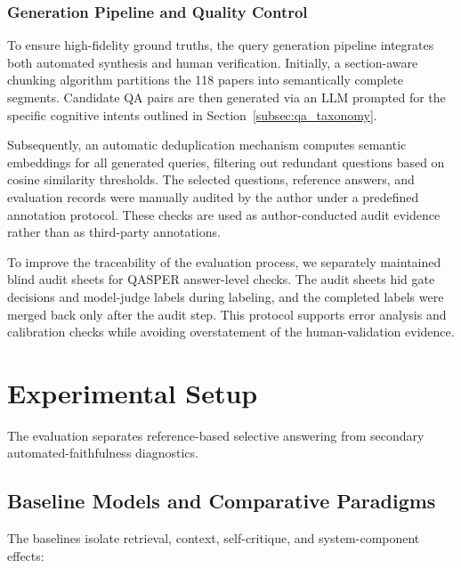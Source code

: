 \documentclass[smallextended]{svjour3}
\begin{document}
\subsubsection{Generation Pipeline and Quality Control}
\label{subsec:quality_control}
To ensure high-fidelity ground truths, the query generation pipeline integrates both automated synthesis and human verification. Initially, a section-aware chunking algorithm partitions the 118 papers into semantically complete segments. Candidate QA pairs are then generated via an LLM prompted for the specific cognitive intents outlined in Section~\ref{subsec:qa_taxonomy}. 

Subsequently, an automatic deduplication mechanism computes semantic embeddings for all generated queries, filtering out redundant questions based on cosine similarity thresholds. The selected questions, reference answers, and evaluation records were manually audited by the author under a predefined annotation protocol. These checks are used as author-conducted audit evidence rather than as third-party annotations.

To improve the traceability of the evaluation process, we separately maintained blind audit sheets for QASPER answer-level checks. The audit sheets hid gate decisions and model-judge labels during labeling, and the completed labels were merged back only after the audit step. This protocol supports error analysis and calibration checks while avoiding overstatement of the human-validation evidence.

\section{Experimental Setup}
\label{sec:experimental_setup}

The evaluation separates reference-based selective answering from secondary automated-faithfulness diagnostics.

\subsection{Baseline Models and Comparative Paradigms}
\label{subsec:baselines}
The baselines isolate retrieval, context, self-critique, and system-component effects:
\end{document}
